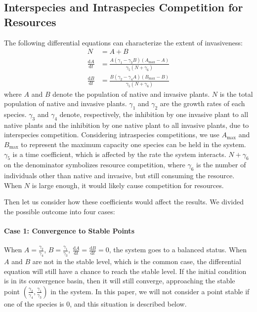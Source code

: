 \documentclass[12pt]{article}
\begin{document}
\subsection{Interspecies and Intraspecies Competition for Resources}
The following differential equations can characterize the extent of invasiveness:
\begin{equation}
\begin{aligned}
N & = A+B \\[0.5em]
\frac{\mathrm{d}A}{\mathrm{d}t} & = \frac{A\left(\gamma_1-\gamma_3 B\right)\left(A_{\max} -A\right)}{\gamma_5 \left(N+\gamma_6\right)}\\[0.5em]
\frac{\mathrm{d}B}{\mathrm{d}t} & = \frac{B\left(\gamma_2-\gamma_4 A\right)\left(B_{\max} -B\right)}{\gamma_5 \left(N+\gamma_6\right)}
\end{aligned}
\end{equation}
where $A$ and $B$ denote the population of native and invasive plants. $N$ is the total population of native and invasive plants. $\gamma_1$ and $\gamma_2$ are the growth rates of each species. $\gamma_3$ and $\gamma_4$ denote, respectively, the inhibition by one invasive plant to all native plants and the inhibition by one native plant to all invasive plants, due to interspecies competition. Considering intraspecies competitions, we use $A_{\max}$ and $B_{\max}$ to represent the maximum capacity one species can be held in the system. $\gamma_5$ is a time coefficient, which is affected by the rate the system interacts. $N+\gamma_6$ on the denominator symbolizes resource competition, where $\gamma_6$ is the number of individuals other than native and invasive, but still consuming the resource. When $N$ is large enough, it would likely cause competition for resources.

Then let us consider how these coefficients would affect the results. We divided the possible outcome into four cases:

\paragraph{Case 1: Convergence to Stable Points} When $A=\frac{\gamma_2}{\gamma_4}$, $B=\frac{\gamma_1}{\gamma_3}$, $\frac{\mathrm{d}A}{\text{d}t}=\frac{\mathrm{d}B}{\text{d}t}=0$, the system goes to a balanced status. When $A$ and $B$ are not in the stable level, which is the common case, the differential equation will still have a chance to reach the stable level. If the initial condition is in its convergence basin, then it will still converge, approaching the stable point $(\frac {\gamma_2}{\gamma_4},\frac {\gamma_1}{\gamma_3})$ in the system. In this paper, we will not consider a point stable if one of the species is $0$, and this situation is described below.
\end{document}
